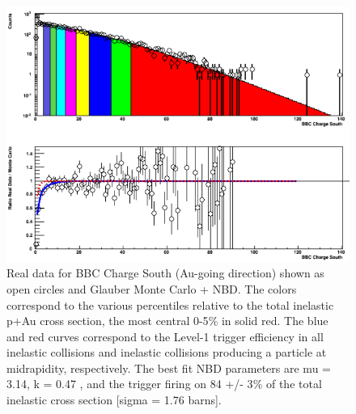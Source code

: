 \begin{figure}[!h]
\begin{center}
\includegraphics[width=0.65\linewidth]{figs/centrality_determination.png}
\caption{Real data for BBC Charge South (Au-going direction) shown as open circles and Glauber Monte Carlo + NBD. The colors correspond to the various
percentiles relative to the total inelastic p+Au cross section, the most central 0-5$\%$ in solid red. The blue and red curves correspond to the Level-1 trigger
efficiency in all inelastic collisions and inelastic collisions producing a particle at midrapidity, respectively. The best fit NBD parameters are mu = 3.14, k = 0.47
, and the trigger firing on 84 +/- 3$\%$ of the total inelastic cross section [sigma = 1.76 barns].}
\end{center}
\end{figure}


